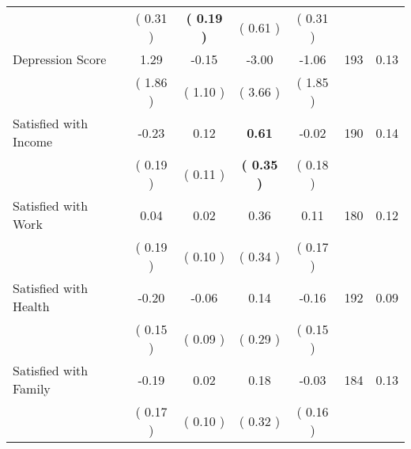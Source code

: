 \begin{tabular}{lcccccc}
 & (     0.31 ) & \textbf{(     0.19 )} & (     0.61 ) & (     0.31 ) & \\
Depression Score &      1.29 &     -0.15 &     -3.00 &     -1.06 & 193 &      0.13 \\ 
 & (     1.86 ) & (     1.10 ) & (     3.66 ) & (     1.85 ) & \\
Satisfied with Income &     -0.23 &      0.12 & \textbf{     0.61} &     -0.02 & 190 &      0.14 \\ 
 & (     0.19 ) & (     0.11 ) & \textbf{(     0.35 )} & (     0.18 ) & \\
Satisfied with Work &      0.04 &      0.02 &      0.36 &      0.11 & 180 &      0.12 \\ 
 & (     0.19 ) & (     0.10 ) & (     0.34 ) & (     0.17 ) & \\
Satisfied with Health &     -0.20 &     -0.06 &      0.14 &     -0.16 & 192 &      0.09 \\ 
 & (     0.15 ) & (     0.09 ) & (     0.29 ) & (     0.15 ) & \\
Satisfied with Family &     -0.19 &      0.02 &      0.18 &     -0.03 & 184 &      0.13 \\ 
 & (     0.17 ) & (     0.10 ) & (     0.32 ) & (     0.16 ) & \\
\bottomrule
\end{tabular}
